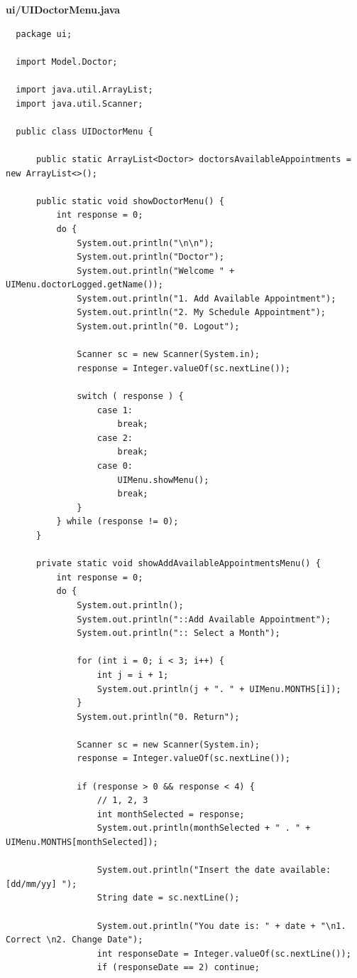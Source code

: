 \documentclass{article}
\begin{document}
\textbf{ui/UIDoctorMenu.java}
\begin{verbatim}
  package ui;

  import Model.Doctor;

  import java.util.ArrayList;
  import java.util.Scanner;

  public class UIDoctorMenu {

      public static ArrayList<Doctor> doctorsAvailableAppointments = new ArrayList<>();

      public static void showDoctorMenu() {
          int response = 0;
          do {
              System.out.println("\n\n");
              System.out.println("Doctor");
              System.out.println("Welcome " + UIMenu.doctorLogged.getName());
              System.out.println("1. Add Available Appointment");
              System.out.println("2. My Schedule Appointment");
              System.out.println("0. Logout");

              Scanner sc = new Scanner(System.in);
              response = Integer.valueOf(sc.nextLine());

              switch ( response ) {
                  case 1:
                      break;
                  case 2:
                      break;
                  case 0:
                      UIMenu.showMenu();
                      break;
              }
          } while (response != 0);
      }

      private static void showAddAvailableAppointmentsMenu() {
          int response = 0;
          do {
              System.out.println();
              System.out.println("::Add Available Appointment");
              System.out.println(":: Select a Month");

              for (int i = 0; i < 3; i++) {
                  int j = i + 1;
                  System.out.println(j + ". " + UIMenu.MONTHS[i]);
              }
              System.out.println("0. Return");

              Scanner sc = new Scanner(System.in);
              response = Integer.valueOf(sc.nextLine());

              if (response > 0 && response < 4) {
                  // 1, 2, 3
                  int monthSelected = response;
                  System.out.println(monthSelected + " . " + UIMenu.MONTHS[monthSelected]);

                  System.out.println("Insert the date available: [dd/mm/yy] ");
                  String date = sc.nextLine();

                  System.out.println("You date is: " + date + "\n1. Correct \n2. Change Date");
                  int responseDate = Integer.valueOf(sc.nextLine());
                  if (responseDate == 2) continue;


\end{verbatim}
\end{document}
